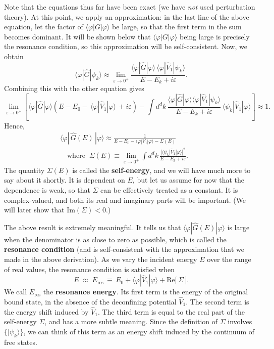 \documentclass[pra,12pt]{revtex4}
\begin{document}
Note that the equations thus far have been exact (we have \textit{not}
used perturbation theory).  At this point, we apply an approximation:
in the last line of the above equation, let the factor of
$\langle\varphi|G|\varphi\rangle$ be large, so that the first term in
the sum becomes dominant.  It will be shown below that
$\langle\varphi|G|\varphi\rangle$ being large is precisely the
resonance condition, so this approximation will be self-consistent.
Now, we obtain
$$\langle\varphi|\hat{G}|\psi_k\rangle \approx \lim_{\varepsilon\rightarrow0^+} \frac{\langle\varphi|\hat{G}|\varphi\rangle \, \langle\varphi|\hat{V}_1|\psi_k\rangle}{E-E_k+i\varepsilon}.$$
Combining this with the other equation gives
$$\lim_{\varepsilon\rightarrow0^+} \left[\langle\varphi|\hat{G}|\varphi\rangle \left(E - E_0 -\, \langle\varphi|\hat{V}_1|\varphi\rangle \, + i\varepsilon\right) - \int d^dk\, \frac{\langle\varphi|\hat{G}|\varphi\rangle\langle\varphi|\hat{V}_1|\psi_k\rangle}{E-E_k+i\varepsilon} \, \langle\psi_k| \hat{V}_1|\varphi\rangle\right] \approx 1.$$
Hence,
$$\boxed{\begin{aligned}\langle\varphi|\,\hat{G}(E)\,|\varphi\rangle \approx \frac{1}{\displaystyle E - E_0 - \langle\varphi|V_1|\varphi\rangle - \Sigma(E)} \qquad \\ \quad \mathrm{where}\;\;\Sigma(E) \equiv \lim_{\varepsilon\rightarrow0^+} \int d^dk\, \frac{\displaystyle| \langle\psi_k| \hat{V}_1|\varphi\rangle|^2}{\displaystyle E-E_k+i\varepsilon}. \qquad
\end{aligned}}$$
The quantity $\Sigma(E)$ is called the \textbf{self-energy}, and we
will have much more to say about it shortly.  It is dependent on $E$,
but let us assume for now that the dependence is weak, so that
$\Sigma$ can be effectively treated as a constant.  It is
complex-valued, and both its real and imaginary parts will be
important.  (We will later show that $\mathrm{Im}(\Sigma) < 0$.)

The above result is extremely meaningful.  It tells us that
$\langle\varphi|\hat{G}(E)|\varphi\rangle$ is large when the
denominator is as close to zero as possible, which is called the
\textbf{resonance condition} (and is self-consistent with the
approximation that we made in the above derivation).  As we vary the
incident energy $E$ over the range of real values, the resonance
condition is satisfied when
$$E \;\approx\; E_{\mathrm{res}} \,\equiv\, E_0 + \langle\varphi|\hat{V}_1|\varphi\rangle + \mathrm{Re}\big[\,\Sigma\,\big].$$
We call $E_{\mathrm{res}}$ the \textbf{resonance energy}.  Its first
term is the energy of the original bound state, in the absence of the
deconfining potential $\hat{V}_1$.  The second term is the energy
shift induced by $\hat{V}_1$.  The third term is equal to the real
part of the self-energy $\Sigma$, and has a more subtle meaning.
Since the definition of $\Sigma$ involves $\{|\psi_k\rangle\}$, we can
think of this term as an energy shift induced by the continuum of free
states.
\end{document}
